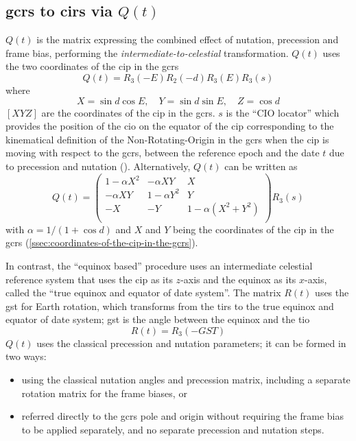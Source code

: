 \subsection{\gls{gcrs} to \gls{cirs} via \(Q(t)\)}
\label{ssec:gcrs-to-cirs-via-q}
\(Q(t)\) is the matrix expressing the combined effect of nutation, precession and 
frame bias, performing the \emph{intermediate-to-celestial} transformation.
\(Q(t)\) uses the two coordinates of the \gls{cip} in the \gls{gcrs}
\begin{equation}
  \label{eq:tn3656}
  Q(t) = R_3 (-E) R_2 (-d) R_3 (E) R_3 (s)
\end{equation}
where
\begin{equation}
  \label{eq:tn3657}
  X = \sin d \cos E , \quad
  Y = \sin d \sin E , \quad
  Z = \cos d
\end{equation}
\(\left[ X  Y  Z \right]\) are the coordinates of the 
\gls{cip} in the \gls{gcrs}.
\(s\) is the ``CIO locator'' which provides the position of the \gls{cio} 
on the equator of the \gls{cip} corresponding to the kinematical definition of 
the Non-Rotating-Origin in the \gls{gcrs} when the \gls{cip} is moving with 
respect to the \gls{gcrs}, between the reference epoch and the date \(t\) due to
precession and nutation (\cite{iers2010}). Alternatively, \(Q(t)\) can be written 
as
\begin{equation}
  \label{eq:tn36510}
  Q(t) = \begin{pmatrix}
    1 - \alpha X^2 & -\alpha XY      & X \\
    -\alpha XY     & 1 - \alpha Y^2  & Y \\
    -X             &  -Y             & 1 - \alpha (X^2 + Y^2)\\
  \end{pmatrix} R_3 (s)
\end{equation}
with \(\alpha = 1 / (1 + \cos d ) \) and \(X\) and \(Y\) being the coordinates of 
the \gls{cip} in the \gls{gcrs} (\ref{ssec:coordinates-of-the-cip-in-the-gcrs}).

In contrast, the ``equinox based'' procedure  uses an intermediate celestial reference 
system that uses the \gls{cip} as its \(z\)-axis and the equinox as its \(x\)-axis, 
called the ``true equinox and equator of date system''. The matrix \(R(t)\) uses 
the \gls{gst} for Earth rotation, which transforms from the \gls{tirs} to the 
true equinox and equator of date system; \gls{gst} is the angle between the equinox 
and the \gls{tio}
\begin{equation}
  R(t) = R_3 (-GST)
\end{equation}
\(Q(t)\) uses the classical precession and nutation parameters; it can be formed 
in two ways: 
\begin{itemize}
  \item using the classical nutation angles and precession matrix, including a 
  separate rotation matrix for the frame biases, or
  \item referred directly to the \gls{gcrs} pole and origin without requiring the 
  frame bias to be applied separately, and no separate precession and nutation
  steps.
\end{itemize}

